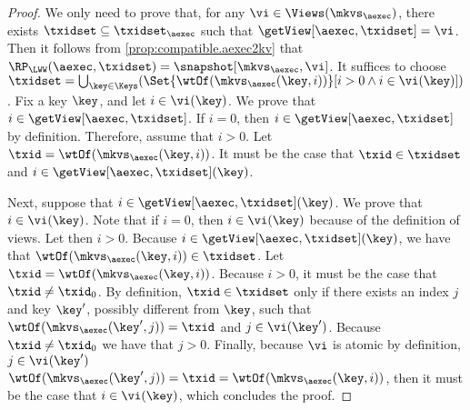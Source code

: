 \begin{proof}
We only need to prove that, for any \(\vi \in \Views(\mkvs_{\aexec})\), there exists \(\txidset \subseteq \txidset_{\aexec}\) such 
that \(\getView[\aexec, \txidset] = \vi\). Then it follows from \cref{prop:compatible.aexec2kv} that 
\(\RP_{\LWW}(\aexec, \txidset) = \snapshot[\mkvs_{\aexec}, \vi]\). 
It suffices to choose \(\txidset = \bigcup_{\key \in \Keys}(\Set{\wtOf(\mkvs_{\aexec}(\key, i))}[ i > 0 \land i \in \vi(\key)])\).
Fix a key \(\key\), and let \(i \in \vi(\key)\). We prove that \(i \in \getView[\aexec, \txidset]\). 
If \(i = 0\), then \(i \in \getView[\aexec, \txidset]\) by definition. 
Therefore, assume that \(i > 0\). Let \(\txid = \wtOf(\mkvs_{\aexec}(\key, i))\).
It must be the case that \(\txid \in \txidset\) and \(i \in \getView[\aexec, \txidset](\key)\).

Next, suppose that \(i \in \getView[\aexec, \txidset](\key)\). We prove that \(i \in \vi(\key)\).
Note that if \(i = 0\), then \(i \in \vi(\key)\) because of the 
definition of views. Let then \(i > 0\). Because \(i \in \getView[\aexec, \txidset](\key)\), we have that 
\(\wtOf(\mkvs_{\aexec}(\key, i)) \in \txidset\).  Let \(\txid = \wtOf(\mkvs_{\aexec}(\key, i))\). Because \(i > 0\), 
it must be the case that \(\txid \neq \txid_0\).
By definition, \(\txid \in \txidset\) only if there 
exists an index \(j\) and key \(\key'\), possibly different from \(\key\), such that \(\wtOf(\mkvs_{\aexec}(\key', j)) = \txid\) and \(j \in \vi(\key')\). 
Because \(\txid \neq \txid_0\) we have that \(j > 0\). Finally, because \(\vi\) is atomic by definition, \(j \in \vi(\key')\)
\(\wtOf(\mkvs_{\aexec}(\key', j)) = \txid = \wtOf(\mkvs_{\aexec}(\key, i))\), then it must be the case 
that \(i \in \vi(\key)\), which concludes the proof.
\end{proof}

